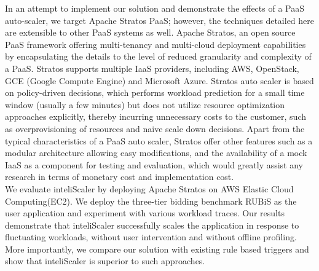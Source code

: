In an attempt to implement our solution and demonstrate the effects of a PaaS auto-scaler, we target Apache Stratos PaaS; however, the techniques detailed here are extensible to other PaaS systems as well. Apache Stratos, an open source PaaS framework offering multi-tenancy and multi-cloud deployment capabilities by encapsulating the details to the level of reduced granularity and complexity of a PaaS. Stratos supports multiple IaaS providers, including AWS, OpenStack, GCE (Google Compute Engine) and Microsoft Azure\cite{website:stratos}. Stratos auto scaler is based on policy-driven  decisions, which performs workload prediction for a small time window (usually a few minutes) but does not utilize resource optimization approaches explicitly, thereby incurring unnecessary costs to the customer, such as overprovisioning of resources and naive scale down decisions. Apart from the typical characteristics of a PaaS auto scaler, Stratos offer other features such as a modular architecture allowing easy modifications, and the availability of a mock IaaS as a component for testing and evaluation, which would greatly assist any research in terms of monetary cost and implementation cost.\\

We evaluate inteliScaler by deploying  Apache Stratos on AWS Elastic Cloud Computing(EC2). We deploy the three-tier bidding benchmark RUBiS as the user application and experiment with various workload traces. Our results demonstrate that inteliScaler successfully scales the application in response to fluctuating workloads, without user intervention and without offline profiling. More importantly, we compare our solution with existing rule based triggers and show that inteliScaler is superior to such approaches.\\
